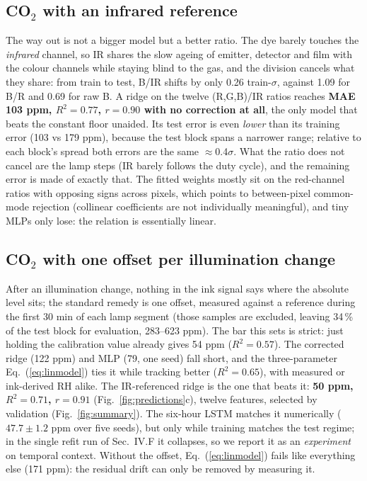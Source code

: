 \documentclass[twocolumn]{revtex4}
\begin{document}
\subsection{CO$_2$ with an infrared reference}

The way out is not a bigger model but a better ratio. The dye barely
touches the \emph{infrared} channel, so IR shares the slow ageing of
emitter, detector and film with the colour channels while staying blind
to the gas, and the division cancels what they share: from train to test, B/IR shifts by only 0.26
train-$\sigma$, against 1.09 for B/R and 0.69 for raw B. A ridge on the
twelve (R,G,B)/IR ratios reaches {\bf MAE 103 ppm, $R^2=0.77$, $r=0.90$
with no correction at all}, the only model that beats the constant
floor unaided. Its test error is even \emph{lower} than its training
error (103 vs 179 ppm), because the test block spans a narrower range;
relative to each block's spread both errors are the same
$\approx$0.4$\sigma$. What the ratio does not cancel are the lamp
steps (IR barely follows the duty cycle), and the remaining error is
made of exactly that. The fitted weights mostly sit on the red-channel
ratios with opposing signs across pixels, which points to between-pixel
common-mode rejection (collinear coefficients are not individually
meaningful), and tiny MLPs only lose: the relation is essentially
linear.

\subsection{CO$_2$ with one offset per illumination change}

After an illumination change, nothing in the ink signal says where the
absolute level sits; the standard remedy is one offset, measured
against a reference during the first 30 min of each lamp segment (those
samples are excluded, leaving 34\,\% of the test block for evaluation,
283--623 ppm). The bar this sets is strict: just holding the
calibration value already gives 54 ppm ($R^2=0.57$). The corrected
ridge (122 ppm) and MLP (79, one seed) fall short, and the
three-parameter Eq.~(\ref{eq:linmodel}) ties it while tracking better
($R^2=0.65$), with measured or ink-derived RH alike. The IR-referenced
ridge is the one that beats it: {\bf 50 ppm, $R^2=0.71$, $r=0.91$}
(Fig.~\ref{fig:predictions}c), twelve features, selected by validation
(Fig.~\ref{fig:summary}). The six-hour LSTM matches it numerically
($47.7\pm1.2$ ppm over five seeds), but only while training matches the
test regime; in the single refit run of Sec.~IV.F it collapses, so we
report it as an \emph{experiment} on temporal context. Without the
offset, Eq.~(\ref{eq:linmodel}) fails like everything else (171 ppm):
the residual drift can only be removed by measuring it.
\end{document}

